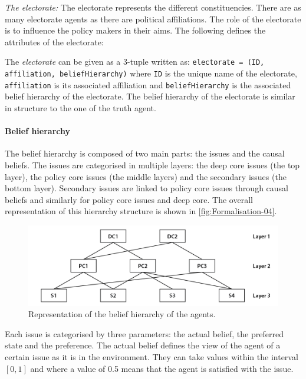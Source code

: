 \documentclass[11pt]{article}
\begin{document}
\emph{The electorate:} The electorate represents the different constituencies. There are as many electorate agents as there are political affiliations. The role of the electorate is to influence the policy makers in their aims. The following defines the attributes of the electorate:

The \emph{electorate} can be given as a 3-tuple written as: \texttt{electorate = (ID, affiliation, beliefHierarchy)} where \texttt{ID} is the unique name of the electorate, \texttt{affiliation} is its associated affiliation and \texttt{beliefHierarchy} is the associated belief hierarchy of the electorate.  The belief hierarchy of the electorate is similar in structure to the one of the truth agent.


\paragraph{Belief hierarchy}

The belief hierarchy is composed of two main parts: the issues and the causal beliefs. The issues are categorised in multiple layers: the deep core issues (the top layer), the policy core issues (the middle layers) and the secondary issues (the bottom layer). Secondary issues are linked to policy core issues through causal beliefs and similarly for policy core issues and deep core. The overall representation of this hierarchy structure is shown in \autoref{fig:Formalisation-04}.

\begin{figure}
\centering
\includegraphics[width = 0.95\linewidth, angle = 0]{figures/Formalisation-04}
\caption{Representation of the belief hierarchy of the agents.}
\label{fig:Formalisation-04}
\end{figure}

Each issue is categorised by three parameters: the actual belief, the preferred state and the preference. The actual belief defines the view of the agent of a certain issue as it is in the environment. They can take values within the interval $[0, 1]$ and where a value of 0.5 means that the agent is satisfied with the issue.
\end{document}
